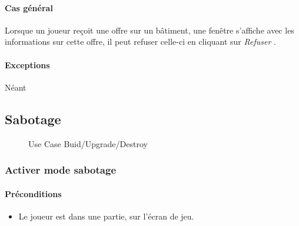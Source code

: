 \documentclass[a4paper,11pt]{report}
\begin{document}
\paragraph{Cas général}
Lorsque un joueur reçoit une offre sur un bâtiment, une fenêtre s'affiche avec les informations sur cette offre, il peut refuser celle-ci en cliquant sur \og \textit{Refuser} \fg.
\paragraph{Exceptions} Néant


\newpage
\subsection{Sabotage}
\begin{figure}[ht]
	\caption{Use Case Buid/Upgrade/Destroy}
\end{figure}

\subsubsection{Activer mode sabotage}
\paragraph{Préconditions}
\begin{itemize}
	\item Le joueur est dans une partie, sur l'écran de jeu.
\end{itemize}
\end{document}
